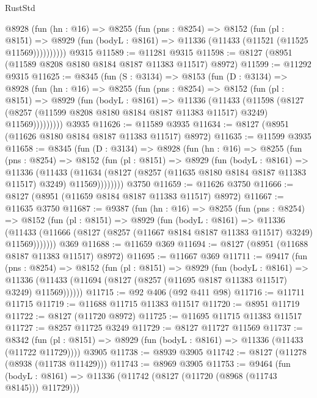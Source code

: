 \begin{lexlean}{RustStd}
\begin{coremodule}
        @8928
          (fun (hn : @16) =>
          @8255
            (fun (pns : @8254) =>
            @8152
              (fun (pl : @8151) =>
              @8929 (fun (bodyL : @8161) => @11336 (@11433 (@11521 (@11525 @11569))))))))))
    @9315
@11589 := @11281 @9315
@11598 := @8127 (@8951 (@11589 @8208 @8180 @8184 @8187 @11383 @11517) @8972)
@11599 := @11292 @9315
@11625 := @8345
    (fun (S : @3134) =>
    @8153
      (fun (D : @3134) =>
      @8928
        (fun (hn : @16) =>
        @8255
          (fun (pns : @8254) =>
          @8152
            (fun (pl : @8151) =>
            @8929
              (fun (bodyL : @8161) =>
              @11336
                (@11433
                  (@11598
                    (@8127
                      (@8257 (@11599 @8208 @8180 @8184 @8187 @11383 @11517) @3249)
                      @11569)))))))))
    @3935
@11626 := @11589 @3935
@11634 := @8127 (@8951 (@11626 @8180 @8184 @8187 @11383 @11517) @8972)
@11635 := @11599 @3935
@11658 := @8345
    (fun (D : @3134) =>
    @8928
      (fun (hn : @16) =>
      @8255
        (fun (pns : @8254) =>
        @8152
          (fun (pl : @8151) =>
          @8929
            (fun (bodyL : @8161) =>
            @11336
              (@11433
                (@11634 (@8127 (@8257 (@11635 @8180 @8184 @8187 @11383 @11517) @3249) @11569))))))))
    @3750
@11659 := @11626 @3750
@11666 := @8127 (@8951 (@11659 @8184 @8187 @11383 @11517) @8972)
@11667 := @11635 @3750
@11687 := @9387
    (fun (hn : @16) =>
    @8255
      (fun (pns : @8254) =>
      @8152
        (fun (pl : @8151) =>
        @8929
          (fun (bodyL : @8161) =>
          @11336
            (@11433 (@11666 (@8127 (@8257 (@11667 @8184 @8187 @11383 @11517) @3249) @11569)))))))
    @369
@11688 := @11659 @369
@11694 := @8127 (@8951 (@11688 @8187 @11383 @11517) @8972)
@11695 := @11667 @369
@11711 := @9417
    (fun (pns : @8254) =>
    @8152
      (fun (pl : @8151) =>
      @8929
        (fun (bodyL : @8161) =>
        @11336 (@11433 (@11694 (@8127 (@8257 (@11695 @8187 @11383 @11517) @3249) @11569))))))
@11715 := @92 @406 (@92 @411 @98)
@11716 := @11711 @11715
@11719 := @11688 @11715 @11383 @11517
@11720 := @8951 @11719
@11722 := @8127 (@11720 @8972)
@11725 := @11695 @11715 @11383 @11517
@11727 := @8257 @11725 @3249
@11729 := @8127 @11727 @11569
@11737 := @8342
    (fun (pl : @8151) => @8929 (fun (bodyL : @8161) => @11336 (@11433 (@11722 @11729))))
    @3905
@11738 := @8939 @3905
@11742 := @8127 (@11278 (@8938 (@11738 @11429)))
@11743 := @8969 @3905
@11753 := @9464
    (fun (bodyL : @8161) => @11336 (@11742 (@8127 (@11720 (@8968 (@11743 @8145))) @11729)))

\end{coremodule}
\end{lexlean}

